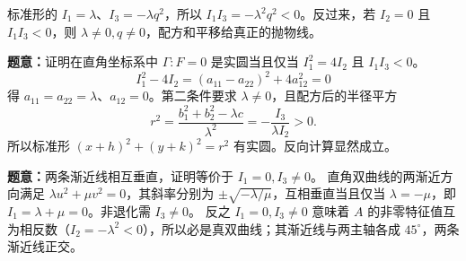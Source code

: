 标准形的 $I_1=\lambda$、$I_3=-\lambda q^2$，所以 $I_1I_3=-\lambda^2q^2<0$。反过来，若 $I_2=0$ 且 $I_1I_3<0$，则 $\lambda\ne0,q\ne0$，配方和平移给真正的抛物线。

\textbf{题意：}证明在直角坐标系中 $\Gamma:F=0$ 是实圆当且仅当 $I_1^2=4I_2$ 且 $I_1I_3<0$。
\[
I_1^2-4I_2=(a_{11}-a_{22})^2+4a_{12}^2=0
\]
得 $a_{11}=a_{22}=\lambda$、$a_{12}=0$。第二条件要求 $\lambda\ne0$，且配方后的半径平方
\[
r^2=\frac{b_1^2+b_2^2-\lambda c}{\lambda^2}
=-\frac{I_3}{\lambda I_2}>0.
\]
所以标准形 $(x+h)^2+(y+k)^2=r^2$ 有实圆。反向计算显然成立。

\textbf{题意：}两条渐近线相互垂直，证明等价于 $I_1=0,I_3\ne0$。
直角双曲线的两渐近方向满足 $\lambda u^2+\mu v^2=0$，其斜率分别为 $\pm\sqrt{-\lambda/\mu}$，互相垂直当且仅当 $\lambda=-\mu$，即 $I_1=\lambda+\mu=0$。非退化需 $I_3\ne0$。
反之 $I_1=0,I_3\ne0$ 意味着 $A$ 的非零特征值互为相反数（$I_2=-\lambda^2<0$），所以必是真双曲线；其渐近线与两主轴各成 $45^\circ$，两条渐近线正交。
